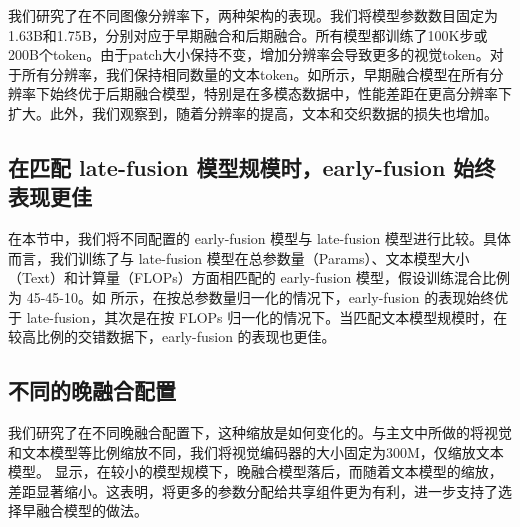 我们研究了在不同图像分辨率下，两种架构的表现。我们将模型参数数目固定为1.63B和1.75B，分别对应于早期融合和后期融合。所有模型都训练了100K步或200B个token。由于patch大小保持不变，增加分辨率会导致更多的视觉token。对于所有分辨率，我们保持相同数量的文本token。如所示，早期融合模型在所有分辨率下始终优于后期融合模型，特别是在多模态数据中，性能差距在更高分辨率下扩大。此外，我们观察到，随着分辨率的提高，文本和交织数据的损失也增加。 

\vspace{1cm}
\subsection{在匹配 late-fusion 模型规模时，early-fusion 始终表现更佳}  
  

在本节中，我们将不同配置的 early-fusion 模型与 late-fusion 模型进行比较。具体而言，我们训练了与 late-fusion 模型在总参数量（Params）、文本模型大小（Text）和计算量（FLOPs）方面相匹配的 early-fusion 模型，假设训练混合比例为 45-45-10。如  所示，在按总参数量归一化的情况下，early-fusion 的表现始终优于 late-fusion，其次是在按 FLOPs 归一化的情况下。当匹配文本模型规模时，在较高比例的交错数据下，early-fusion 的表现也更佳。
\subsection{不同的晚融合配置}
我们研究了在不同晚融合配置下，这种缩放是如何变化的。与主文中所做的将视觉和文本模型等比例缩放不同，我们将视觉编码器的大小固定为300M，仅缩放文本模型。  显示，在较小的模型规模下，晚融合模型落后，而随着文本模型的缩放，差距显著缩小。这表明，将更多的参数分配给共享组件更为有利，进一步支持了选择早融合模型的做法。

